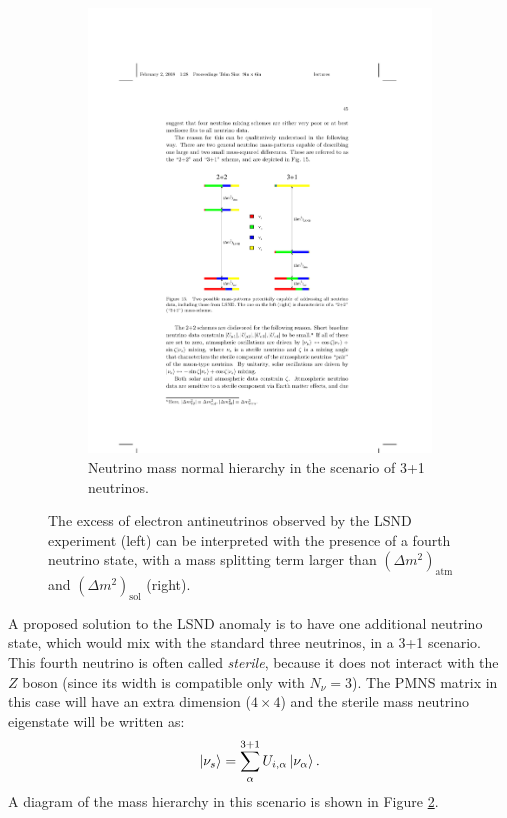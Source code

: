 \begin{figure}[htbp]
\begin{subfigure}{0.45\textwidth}
\begin{center}
        \includegraphics[height=\linewidth]{figures/masslsnd.pdf}
        \caption{Neutrino mass normal hierarchy in the scenario of 3+1 neutrinos.}\label{fig:masslsnd}
    \end{center}
  \end{subfigure}
    \caption{The excess of electron antineutrinos observed by the LSND experiment (left) can be interpreted with the presence of a fourth neutrino state, with a mass splitting term larger than $(\Delta m^2)_{\mathrm{atm}}$ and $(\Delta m^2)_{\mathrm{sol}}$ (right).}
\end{figure}

A proposed solution to the LSND anomaly is to have one additional neutrino state, which would mix with the standard three neutrinos, in a 3+1 scenario. This fourth neutrino is often called \emph{sterile}, because it does not interact with the $Z$ boson (since its width is compatible only with $N_{\nu}=3$). The PMNS matrix in this case will have an extra dimension ($4\times4$) and the sterile mass neutrino eigenstate will be written as:
\begin{equation}
    \ket{\nu_s}=\sum^{3+1}_{\alpha}U_{i,\alpha}\ket{\nu_{\alpha}}.
\end{equation}
A diagram of the mass hierarchy in this scenario is shown in Figure \ref{fig:masslsnd}.

